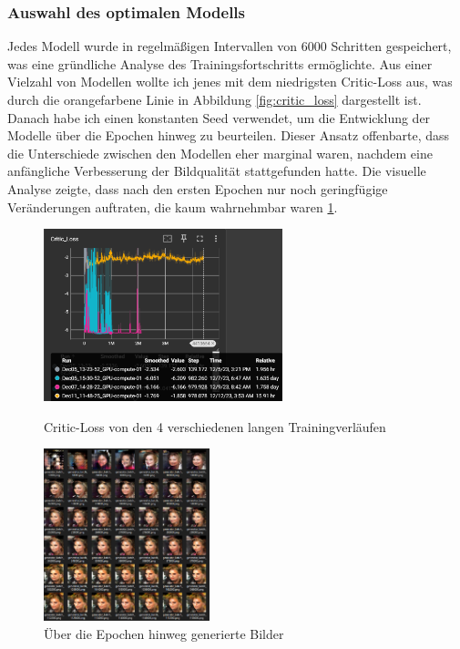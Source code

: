 \documentclass[a4paper, 12pt]{article}
\begin{document}
\subsubsection{Auswahl des optimalen Modells}
Jedes Modell wurde in regelmäßigen Intervallen von 6000 Schritten gespeichert, was eine gründliche Analyse des Trainingsfortschritts ermöglichte. Aus einer Vielzahl von Modellen wollte ich jenes mit dem niedrigsten Critic-Loss aus, was durch die orangefarbene Linie in Abbildung \ref{fig:critic_loss} dargestellt ist. Danach habe ich einen konstanten Seed verwendet, um die Entwicklung der Modelle über die Epochen hinweg zu beurteilen. Dieser Ansatz offenbarte, dass die Unterschiede zwischen den Modellen eher marginal waren, nachdem eine anfängliche Verbesserung der Bildqualität stattgefunden hatte. Die visuelle Analyse zeigte, dass nach den ersten Epochen nur noch geringfügige Veränderungen auftraten, die kaum wahrnehmbar waren \ref{fig:epochs}.

\begin{figure}[ht]
\centering
\begin{minipage}[t]{0.45\textwidth}
\centering
\includegraphics[height=5cm, keepaspectratio]{./img/alle_modelle.png}
\caption{Critic-Loss von den 4 verschiedenen langen Trainingverläufen}
\label{fig:critic_loss}
\end{minipage}
\hfill %
\begin{minipage}[t]{0.45\textwidth}
\centering
\includegraphics[height=5cm, keepaspectratio]{./img/epochs.png}
\caption{Über die Epochen hinweg generierte Bilder}
\label{fig:epochs}
\end{minipage}
\end{figure}
\end{document}
